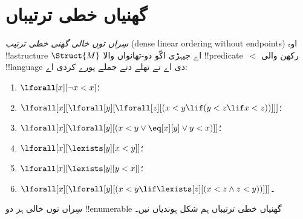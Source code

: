 \documentclass[../../../include/open-logic-section]{subfiles}
\begin{document}
\section{گھنیاں خطی ترتیباں}

\begin{defn}
  \emph{سِراں توں خالی گھنی خطی ترتیب}
  (dense linear ordering without endpoints) اوہ !!a{structure}
  $\Struct{M}$ اے جیہڑی اکّو دو-تھانواں والا
  !!{predicate}~$<$ رکھن والی !!{language} دی اے تے تھلے دتے
  جملے پورے کردی اے:
  \begin{enumerate}
  \item $\lforall[x][\lnot x < x]$؛
  \item $\lforall[x][\lforall[y][\lforall[z][(x < y \lif (y < z \lif x
    <z ))]]]$؛
  \item $\lforall[x][\lforall[y][(x< y \lor \eq[x][y] \lor y < x)]]$؛
  \item $\lforall[x][\lexists[y][x < y]]$؛
  \item $\lforall[x][\lexists[y][y < x]]$؛
  \item $\lforall[x][\lforall[y][(x < y \lif \lexists[z][(x < z \land
        z < y))]]]$۔
 \end{enumerate}
\end{defn}

\begin{thm}
  سِراں توں خالی ہر دو !!{enumerable} گھنیاں خطی ترتیباں
  ہم شکل ہوندیاں نیں۔
\end{thm}
\end{document}
